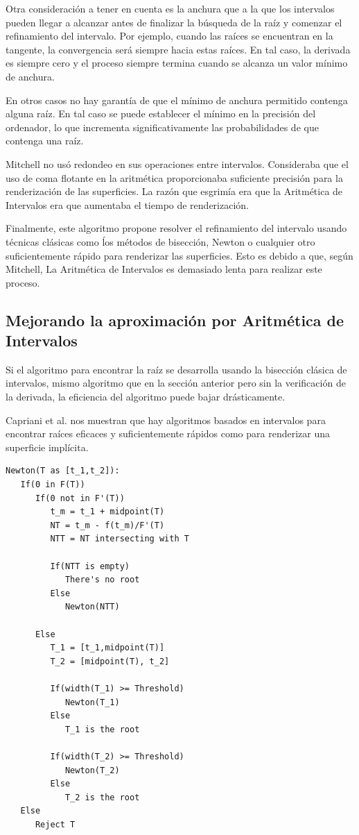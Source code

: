 Otra consideración a tener en cuenta es la anchura que a la que los intervalos pueden llegar a alcanzar antes de finalizar la búsqueda de la raíz y comenzar el refinamiento del intervalo. Por ejemplo, cuando las raíces se encuentran en la tangente, la convergencia será siempre hacia estas raíces. En tal caso, la derivada es siempre cero y el proceso siempre termina cuando se alcanza un valor mínimo de anchura.

En otros casos no hay garantía de que el mínimo de anchura permitido contenga alguna raíz. En tal caso se puede establecer el mínimo en la precisión del ordenador, lo que incrementa significativamente las probabilidades de que contenga una raíz\cite{Capriani00}.

Mitchell no usó redondeo en sus operaciones entre intervalos. Consideraba que el uso de coma flotante en la aritmética proporcionaba suficiente precisión para la renderización de las superficies. La razón que esgrimía era que la Aritmética de Intervalos era que aumentaba el tiempo de renderización.

Finalmente, este algoritmo propone resolver el refinamiento del intervalo usando técnicas clásicas como ĺos métodos de bisección, Newton o cualquier otro suficientemente rápido para renderizar las superficies. Esto es debido a que, según Mitchell, La Aritmética de Intervalos es demasiado lenta para realizar este proceso.

\subsection{Mejorando la aproximación por Aritmética de Intervalos}

Si el algoritmo para encontrar la raíz se desarrolla usando la bisección clásica de intervalos, mismo algoritmo que en la sección anterior pero sin la verificación de la derivada, la eficiencia del algoritmo puede bajar drásticamente.

Capriani et al. \cite{Capriani00} nos muestran que hay algoritmos basados en intervalos para encontrar raíces eficaces y suficientemente rápidos como para renderizar una superficie implícita.
\begin{verbatim}
Newton(T as [t_1,t_2]):
   If(0 in F(T))
      If(0 not in F'(T))
         t_m = t_1 + midpoint(T)
         NT = t_m - f(t_m)/F'(T)
         NTT = NT intersecting with T
        
         If(NTT is empty)
            There's no root
         Else
            Newton(NTT)
        
      Else
         T_1 = [t_1,midpoint(T)]
         T_2 = [midpoint(T), t_2]
         
         If(width(T_1) >= Threshold)
            Newton(T_1)
         Else
            T_1 is the root
            
         If(width(T_2) >= Threshold)
            Newton(T_2)
         Else
            T_2 is the root
   Else
      Reject T
\end{verbatim}

